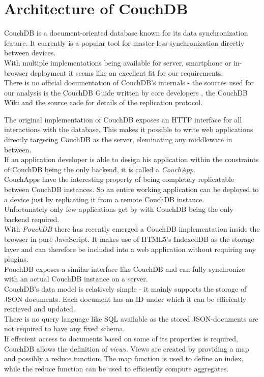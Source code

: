 \section{Architecture of CouchDB}
\label{sec:main.couchdb}
CouchDB is a document-oriented database known for its data synchronization feature.
It currently is a popular tool for master-less synchronization directly between devices.\\
With multiple implementations being available for server, smartphone or in-browser deployment it seems like an excellent fit for our requirements.\\
There is no official documentation of CouchDB's internals - the sources used for our analysis is the CouchDB Guide written by core developers \cite{anderson2010couchdb}, the CouchDB Wiki \cite{couchdb_wiki} and the source code \cite{couchdb_source} for details of the replication protocol.

The original implementation of CouchDB exposes an HTTP interface for all interactions with the database.
This makes it possible to write web applications directly targeting CouchDB as the server, eleminating any middleware in between.\\
If an application developer is able to design his application within the constraints of CouchDB being the only backend, it is called a \emph{CouchApp}.\\
CouchApps have the interesting property of being completely replicatable between CouchDB instances.
So an entire working application can be deployed to a device just by replicating it from a remote CouchDB instance.\\
Unfortunately only few applications get by with CouchDB being the only backend required.\\

With \emph{PouchDB} there has recently emerged a CouchDB implementation inside the browser in pure JavaScript.
It makes use of HTML5's IndexedDB as the storage layer and can therefore be included into a web application without requiring any plugins.\\
PouchDB exposes a similar interface like CouchDB and can fully synchronize with an actual CouchDB instance on a server.\\

CouchDB's data model is relatively simple - it mainly supports the storage of JSON-documents.
Each document has an ID under which it can be efficiently retrieved and updated.\\
There is no query language like SQL available as the stored JSON-documents are not required to have any fixed schema.\\
If effecient access to documents based on some of its properties is required, CouchDB allows the definition of \emph{views}.
Views are created by providing a map and possibly a reduce function.
The map function is used to define an index, while the reduce function can be used to efficiently compute aggregates.\\

